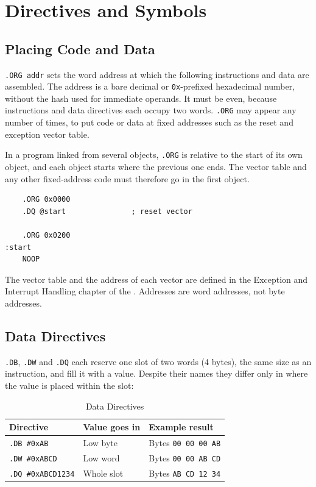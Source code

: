 \chapter{Directives and Symbols}
\label{ch:directives-and-symbols}

\section{Placing Code and Data}
\label{sec:org}

\texttt{.ORG addr} sets the word address at which the following instructions and data are assembled. The address is a
bare decimal or \texttt{0x}-prefixed hexadecimal number, without the hash used for immediate operands. It must be
even, because instructions and data directives each occupy two words. \texttt{.ORG} may appear any number of times, to
put code or data at fixed addresses such as the reset and exception vector table.

In a program linked from several objects, \texttt{.ORG} is relative to the start of its own object, and each object
starts where the previous one ends. The vector table and any other fixed-address code must therefore go in the first
object.

\begin{lstlisting}
    .ORG 0x0000
    .DQ @start               ; reset vector

    .ORG 0x0200
:start
    NOOP
\end{lstlisting}

The vector table and the address of each vector are defined in the Exception and Interrupt Handling chapter of the
\archmanual{}. Addresses are word addresses, not byte addresses.

\section{Data Directives}

\texttt{.DB}, \texttt{.DW} and \texttt{.DQ} each reserve one slot of two words (4 bytes), the same size as an
instruction, and fill it with a value. Despite their names they differ only in where the value is placed within the
slot:

\begin{table}[H]
	\centering
	\begin{tabular}{lll}
		\toprule
		\textbf{Directive}        & \textbf{Value goes in} & \textbf{Example result}    \\
		\midrule
		\texttt{.DB \#0xAB}       & Low byte               & Bytes \texttt{00 00 00 AB} \\
		\texttt{.DW \#0xABCD}     & Low word               & Bytes \texttt{00 00 AB CD} \\
		\texttt{.DQ \#0xABCD1234} & Whole slot             & Bytes \texttt{AB CD 12 34} \\
		\bottomrule
	\end{tabular}
	\caption{Data Directives}
	\label{tab:data-directives}
\end{table}

